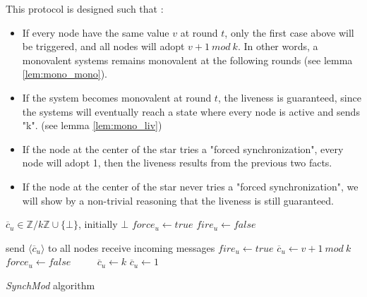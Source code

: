 \documentclass{article}
\begin{document}
\noindent This protocol is designed such that :
\begin{itemize}
	\item If every node have the same value $v$ at round $t$, only the first case above will be triggered, and all nodes will adopt $v+1~mod~k$.
		In other words, a monovalent systems remains monovalent at the following rounds (see lemma \ref{lem:mono_mono}).
	\item If the system becomes monovalent at round $t$, the liveness is guaranteed, since the systems will eventually reach a state where every node is active and sends "k".
		(see lemma \ref{lem:mono_liv})
	\item If the node at the center of the star tries a "forced synchronization", every node will adopt 1, then the liveness results from the previous two facts.
	\item If the node at the center of the star never tries a "forced synchronization", we will show by a non-trivial reasoning that the liveness is still guaranteed.
\end{itemize}


\begin{algorithm}[htb]
\begin{distribalgo}[1]
\BLANK {}
	\STATE $\overline{c}_u \in \mathds{Z}/k\mathds{Z} \cup \{\bot\}$, initially $\bot$
	\STATE $force_u \leftarrow true$
	\STATE $fire_u \leftarrow false$

\ENDINDENT \BLANK

	\STATE send $\langle \overline{c}_u \rangle$ to all nodes
	\STATE receive incoming messages
		\STATE $fire_u \leftarrow true$
	\ENDIF
		\STATE $\overline{c}_u \leftarrow v+1~mod~k$
		\STATE $force_u \leftarrow false$ ~~~~
		\STATE $\overline{c}_u \leftarrow k$
	\ELSE
		\STATE $\overline{c}_u \leftarrow 1$ ~~~~
	\ENDIF
\ENDINDENT 
\caption{{\em SynchMod} algorithm} \label{algo:R}
\end{distribalgo}

\end{algorithm}
\end{document}
